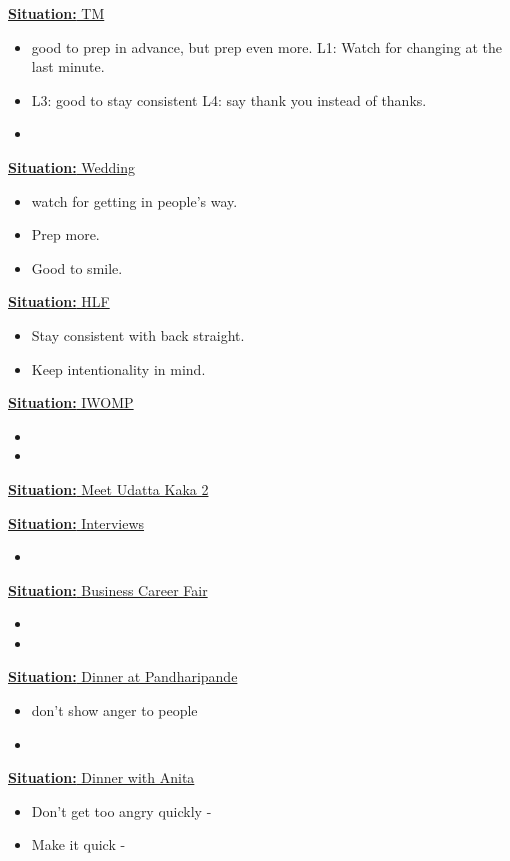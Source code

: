 \documentclass[11pt]{article}
\newcommand{\newSituation}[1]{\underline{\textbf{Situation:} #1} }
\begin{document}
{\newSituation{TM} 
\begin{itemize} 
\tiny \item \tiny good to prep in advance, but prep even more. L1:
Watch for changing at the last minute.
\tiny \item \tiny L3: good to stay consistent L4: say thank you
instead of thanks.
\item \tiny 
\end{itemize} 

\newSituation{Wedding} 
\begin{itemize}
\item \tiny watch for getting in people's way.
\item \tiny Prep more.
\item \tiny Good to smile.
\end{itemize} 

\newSituation{HLF} 
\begin{itemize} 
\tiny \item \tiny Stay consistent with back straight. 
\item \tiny Keep intentionality in mind. 
\end{itemize}

\newSituation{IWOMP}
\begin{itemize}
\item \tiny 
\item \tiny
\end{itemize} 

\newSituation{Meet Udatta Kaka 2} 
\begin{itemize} 
\end{itemize} 

\newSituation{Interviews} 
\begin{itemize} 
\tiny \item \tiny 
\end{itemize}  


\newSituation{Business Career Fair} 
\begin{itemize}
\tiny \item \tiny 
\item \tiny 
\end{itemize}


\newSituation{Dinner at Pandharipande} 
\begin{itemize} 
\item \tiny don't show anger to people 
\item \tiny 
\end{itemize} 

\newSituation{Dinner with Anita} 
\begin{itemize}  
\item \tiny Don't get too angry quickly  - 
\tiny \item \tiny Make it quick - 
\end{itemize}   

}
\end{document}
